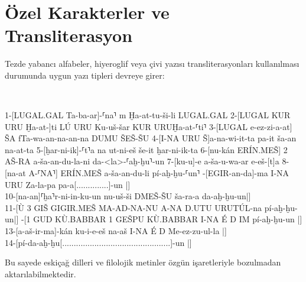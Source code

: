 \section{Özel Karakterler ve Transliterasyon}
Tezde yabancı alfabeler, hiyeroglif veya çivi yazısı transliterasyonları kullanılması durumunda uygun yazı tipleri devreye girer:
\begin{center}

\vspace{0.8em}

 \\{}
\end{center}

\vspace{0.8em}

\begin{htranslit}
1-[LUGAL.GAL Ta-ba-ar]-⸢na⸣ m Ḫa-at-tu-ši-li LUGAL.GAL 
2-[LUGAL KUR URU Ḫa-at-]ti LÚ URU Ku-uš-šar KUR URUḪa-at-⸢ti⸣ 
3-[LUGAL e-ez-zi-a-at] ŠA fTa-wa-an-na-an-na DUMU ŠEŠ-ŠU  
4-[I-NA URU Š]a-na-wi-it-ta pa-it ša-an na-at-ta 
5-[ḫar-ni-ik]-⸢t⸣a na ut-ni-eš še-it ḫar-ni-ik-ta 
6-[nu-kán ERÍN.MEŠ] 2 AŠ-RA a-ša-an-du-la-ni da-<la>-⸢aḫ-ḫu⸣-un 
7-[ku-u]-e a-ša-u-wa-ar e-eš-[t]a 
8-[na-at A-⸢NA⸣] ERÍN.MEŠ a-ša-an-du-li pí-aḫ-ḫu-⸢un⸣ 
-[EGIR-an-da]-ma I-NA URU Za-la-pa pa-a[..............]-un |] \\
10-[na-an]⸢ḫa⸣r-ni-in-ku-un nu-uš-ši DMEŠ-ŠU ša-ra-a da-aḫ-ḫu-un|] \\
11-[Ù 3 GIŠ GIGIR.MEŠ MA-AD-NA-NU A-NA D.UTU URUTÚL-na pí-aḫ-ḫu-un|]
-[1 GUD KÙ.BABBAR 1 GEŠPU KÙ.BABBAR I-NA É D IM pí-aḫ-ḫu-un |] \\
13-[a-aš-ir-ma]-kán ku-i-e-eš na-aš I-NA É D Me-ez-zu-ul-la |] \\
14-[pí-da-aḫ-ḫu[...............................................]-un |]
  
\end{htranslit}

Bu sayede eskiçağ dilleri ve filolojik metinler özgün işaretleriyle bozulmadan aktarılabilmektedir.

